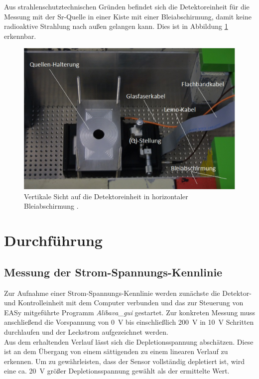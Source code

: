 Aus strahlenschutztechnischen Gründen befindet sich die Detektoreinheit für die Messung mit der Sr-Quelle in einer Kiste mit einer Bleiabschirmung, damit keine radioaktive Strahlung nach außen gelangen kann. Dies ist in Abbildung \ref{fig:quell} erkennbar.
\begin{figure}[htb]
  \centering
  \includegraphics{graphics/Abschirmung.png}
  \caption{Vertikale Sicht auf die Detektoreinheit in horizontaler Bleiabschirmung \cite{anleitung}.}
  \label{fig:quell}
\end{figure}

\FloatBarrier
\section{Durchführung}
\label{sec:Durchführung}

\subsection{Messung der Strom-Spannungs-Kennlinie}
\label{sec:Kennlinie}
Zur Aufnahme einer Strom-Spannungs-Kennlinie werden zunächste die Detektor- und Kontrolleinheit mit dem Computer verbunden und das zur Steuerung von EASy mitgeführte Programm \textit{Alibava\_gui} gestartet. Zur konkreten Messung muss anschließend die Vorspannung von \SI{0}{\volt} bis einschließlich \SI{200}{\volt} in \SI{10}{\volt} Schritten durchlaufen und der Leckstrom aufgezeichnet werden.\\
Aus dem erhaltenden Verlauf lässt sich die Depletionsspannung abschätzen. Diese ist an dem Übergang von einem sättigenden zu einem linearen Verlauf zu erkennen. Um zu gewährleisten, dass der Sensor vollständig depletiert ist, wird eine ca. \SI{20}{\volt} größer Depletionsspannung gewählt als der ermittelte Wert.

